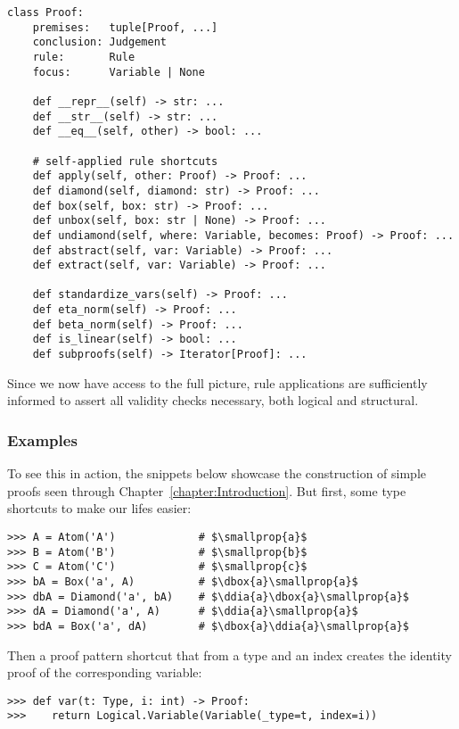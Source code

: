 \begin{verbatim}
class Proof:
    premises:   tuple[Proof, ...]
    conclusion: Judgement
    rule:       Rule
    focus:      Variable | None
    
    def __repr__(self) -> str: ...
    def __str__(self) -> str: ...
    def __eq__(self, other) -> bool: ...
    
    # self-applied rule shortcuts
    def apply(self, other: Proof) -> Proof: ...
    def diamond(self, diamond: str) -> Proof: ...
    def box(self, box: str) -> Proof: ...
    def unbox(self, box: str | None) -> Proof: ...
    def undiamond(self, where: Variable, becomes: Proof) -> Proof: ... 
    def abstract(self, var: Variable) -> Proof: ...
    def extract(self, var: Variable) -> Proof: ...

    def standardize_vars(self) -> Proof: ...
    def eta_norm(self) -> Proof: ...
    def beta_norm(self) -> Proof: ...
    def is_linear(self) -> bool: ...
    def subproofs(self) -> Iterator[Proof]: ...

\end{verbatim}

\noindent Since we now have access to the full picture, rule applications are sufficiently informed to assert all validity checks necessary, both logical and structural.

\subsubsection{Examples}
To see this in action, the snippets below showcase the construction of simple proofs seen through Chapter~\ref{chapter:Introduction}.
But first, some type shortcuts to make our lifes easier:

\begin{verbatim}
>>> A = Atom('A')             # $\smallprop{a}$
>>> B = Atom('B')             # $\smallprop{b}$
>>> C = Atom('C')             # $\smallprop{c}$
>>> bA = Box('a', A)          # $\dbox{a}\smallprop{a}$
>>> dbA = Diamond('a', bA)    # $\ddia{a}\dbox{a}\smallprop{a}$
>>> dA = Diamond('a', A)      # $\ddia{a}\smallprop{a}$
>>> bdA = Box('a', dA)        # $\dbox{a}\ddia{a}\smallprop{a}$
\end{verbatim}

\noindent Then a proof pattern shortcut that from a type and an index creates the identity proof of the corresponding variable:
\begin{verbatim}
>>> def var(t: Type, i: int) -> Proof:
>>>    return Logical.Variable(Variable(_type=t, index=i))
\end{verbatim}

